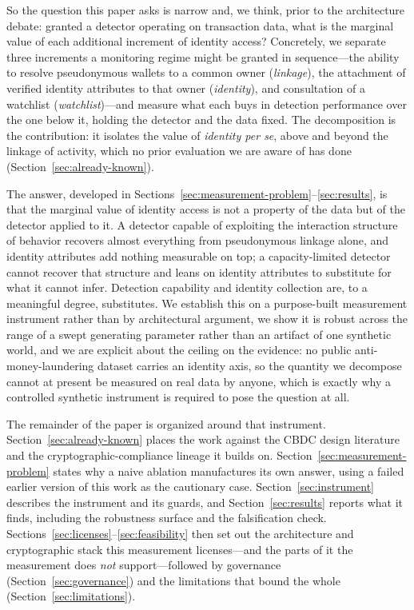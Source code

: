 \documentclass[11pt]{article}
\begin{document}
So the question this paper asks is narrow and, we think, prior to the architecture debate: granted a
detector operating on transaction data, what is the marginal value of each additional increment of
identity access? Concretely, we separate three increments a monitoring regime might be granted in
sequence---the ability to resolve pseudonymous wallets to a common owner (\emph{linkage}), the
attachment of verified identity attributes to that owner (\emph{identity}), and consultation of a
watchlist (\emph{watchlist})---and measure what each buys in detection performance over the one below
it, holding the detector and the data fixed. The decomposition is the contribution: it isolates the
value of \emph{identity per se}, above and beyond the linkage of activity, which no prior evaluation
we are aware of has done (Section~\ref{sec:already-known}).

The answer, developed in Sections~\ref{sec:measurement-problem}--\ref{sec:results}, is that the
marginal value of identity access is not a property of the data but of the detector applied to it. A
detector capable of exploiting the interaction structure of behavior recovers almost everything from
pseudonymous linkage alone, and identity attributes add nothing measurable on top; a
capacity-limited detector cannot recover that structure and leans on identity attributes to
substitute for what it cannot infer. Detection capability and identity collection are, to a
meaningful degree, substitutes. We establish this on a purpose-built measurement instrument rather
than by architectural argument, we show it is robust across the range of a swept generating
parameter rather than an artifact of one synthetic world, and we are explicit about the ceiling on
the evidence: no public anti-money-laundering dataset carries an identity axis, so the quantity we
decompose cannot at present be measured on real data by anyone, which is exactly why a controlled
synthetic instrument is required to pose the question at all.

The remainder of the paper is organized around that instrument. Section~\ref{sec:already-known}
places the work against the CBDC design literature and the cryptographic-compliance lineage it builds
on. Section~\ref{sec:measurement-problem} states why a naive ablation manufactures its own answer,
using a failed earlier version of this work as the cautionary case.
Section~\ref{sec:instrument} describes the instrument and its guards, and
Section~\ref{sec:results} reports what it finds, including the robustness surface and the
falsification check. Sections~\ref{sec:licenses}--\ref{sec:feasibility} then set out the
architecture and cryptographic stack this measurement licenses---and the parts of it the measurement
does \emph{not} support---followed by governance (Section~\ref{sec:governance}) and the limitations
that bound the whole (Section~\ref{sec:limitations}).
\end{document}
